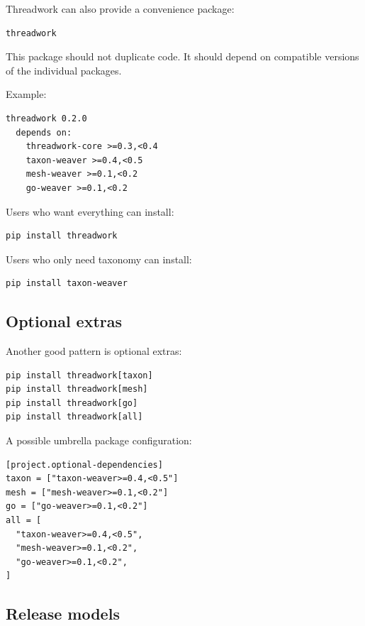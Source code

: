 \documentclass[11pt,a4paper]{article}
\begin{document}
Threadwork can also provide a convenience package:

\begin{Verbatim}[fontsize=\small]
threadwork
\end{Verbatim}

This package should not duplicate code. It should depend on compatible versions of the individual packages.

Example:

\begin{Verbatim}[fontsize=\small]
threadwork 0.2.0
  depends on:
    threadwork-core >=0.3,<0.4
    taxon-weaver >=0.4,<0.5
    mesh-weaver >=0.1,<0.2
    go-weaver >=0.1,<0.2
\end{Verbatim}

Users who want everything can install:

\begin{Verbatim}[fontsize=\small]
pip install threadwork
\end{Verbatim}

Users who only need taxonomy can install:

\begin{Verbatim}[fontsize=\small]
pip install taxon-weaver
\end{Verbatim}

\subsection{Optional extras}

Another good pattern is optional extras:

\begin{Verbatim}[fontsize=\small]
pip install threadwork[taxon]
pip install threadwork[mesh]
pip install threadwork[go]
pip install threadwork[all]
\end{Verbatim}

A possible umbrella package configuration:

\begin{Verbatim}[fontsize=\small]
[project.optional-dependencies]
taxon = ["taxon-weaver>=0.4,<0.5"]
mesh = ["mesh-weaver>=0.1,<0.2"]
go = ["go-weaver>=0.1,<0.2"]
all = [
  "taxon-weaver>=0.4,<0.5",
  "mesh-weaver>=0.1,<0.2",
  "go-weaver>=0.1,<0.2",
]
\end{Verbatim}

\subsection{Release models}
\end{document}
